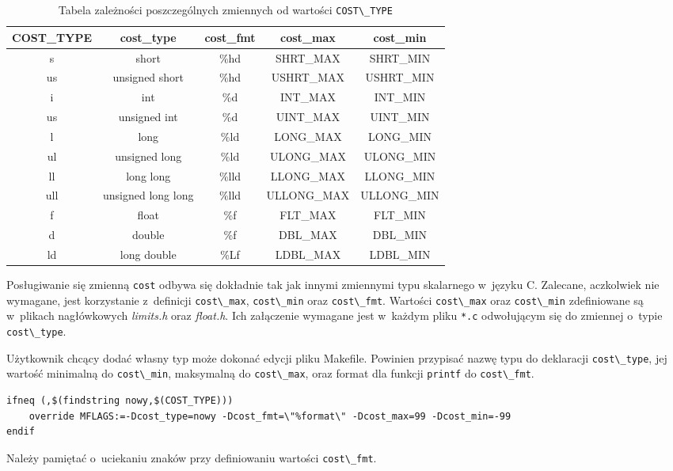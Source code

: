 \documentclass[a4paper,12pt,polish,oneside]{thesis}
\newcommand\code[1]{\lstinline[style=line]{#1}}
\begin{document}
\begin{table}[htb]
\caption{Tabela zależności poszczególnych zmiennych od wartości \code{COST\_TYPE}}
\label{tab:dep}
\begin{tabular}{ | c | c | c | c | c | }
	\hline
	COST\_TYPE  & cost\_type            & cost\_fmt  & cost\_max      & cost\_min      \\
	\hline \hline
	s           & short                 & \%hd       & SHRT\_MAX      & SHRT\_MIN      \\ \hline
	us          & unsigned short        & \%hd       & USHRT\_MAX     & USHRT\_MIN     \\ \hline
	i           & int                   & \%d        & INT\_MAX       & INT\_MIN       \\ \hline
	us          & unsigned int          & \%d        & UINT\_MAX      & UINT\_MIN      \\ \hline
	l           & long                  & \%ld       & LONG\_MAX      & LONG\_MIN      \\ \hline
	ul          & unsigned long         & \%ld       & ULONG\_MAX     & ULONG\_MIN     \\ \hline
	ll          & long long             & \%lld      & LLONG\_MAX     & LLONG\_MIN     \\ \hline
	ull         & unsigned long long    & \%lld      & ULLONG\_MAX    & ULLONG\_MIN    \\ \hline
	f           & float                 & \%f        & FLT\_MAX       & FLT\_MIN       \\ \hline
	d           & double                & \%f        & DBL\_MAX       & DBL\_MIN       \\ \hline
	ld          & long double           & \%Lf       & LDBL\_MAX      & LDBL\_MIN      \\ \hline
\end{tabular}
\end{table}

Posługiwanie się zmienną \code{cost} odbywa się dokładnie tak jak innymi zmiennymi typu skalarnego w~języku C.
Zalecane, aczkolwiek nie wymagane, jest korzystanie z~definicji \code{cost\_max}, \code{cost\_min} oraz \code{cost\_fmt}.
Wartości \code{cost\_max} oraz \code{cost\_min} zdefiniowane są w~plikach nagłówkowych \emph{limits.h} oraz \emph{float.h}. Ich załączenie wymagane jest w~każdym pliku \code{*.c} odwołującym się do zmiennej o~typie \code{cost\_type}.

Użytkownik chcący dodać własny typ może dokonać edycji pliku Makefile.
Powinien przypisać nazwę typu do deklaracji \code{cost\_type}, jej wartość minimalną do \code{cost\_min}, maksymalną do \code{cost\_max}, oraz format dla funkcji \code{printf} do \code{cost\_fmt}.
\begin{lstlisting}[style=coden,caption=Przykład nowego typu kosztu krawędzi]
ifneq (,$(findstring nowy,$(COST_TYPE)))
	override MFLAGS:=-Dcost_type=nowy -Dcost_fmt=\"%format\" -Dcost_max=99 -Dcost_min=-99
endif

\end{lstlisting}
Należy pamiętać o~uciekaniu znaków przy definiowaniu wartości \code{cost\_fmt}.
\end{document}
